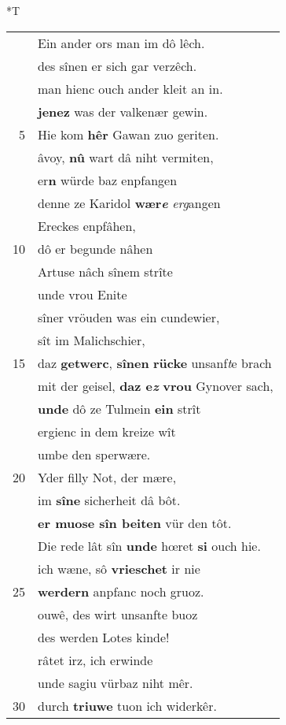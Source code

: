 \documentclass[8pt,a4paper,notitlepage]{article}
\begin{document}
\begin{table}[ht]
\begin{minipage}[t]{0.5\linewidth}
\small
\begin{center}*T
\end{center}
\begin{tabular}{rl}
 & Ein ander ors man im dô lêch.\\ 
 & des sînen er sich gar verzêch.\\ 
 & man hienc ouch ander kleit an in.\\ 
 & \textbf{jenez} was der valkenær gewin.\\ 
5 & Hie kom \textbf{hêr} Gawan zuo geriten.\\ 
 & âvoy, \textbf{nû} wart dâ niht vermiten,\\ 
 & er\textbf{n} würde baz enpfangen\\ 
 & denne ze Karidol \textbf{wær\textit{e}} \textit{erg}angen\\ 
 & Ereckes enpfâhen,\\ 
10 & dô er begunde nâhen\\ 
 & Artuse nâch sînem strîte\\ 
 & unde vrou Enite\\ 
 & sîner vröuden was ein cundewier,\\ 
 & sît im Malichschier,\\ 
15 & daz \textbf{getwerc}, \textbf{sînen} \textbf{rücke} unsanf\textit{t}e brach\\ 
 & mit der geisel, \textbf{daz e\textit{z}} \textbf{vrou} Gynover sach,\\ 
 & \textbf{unde} dô ze Tulmein \textbf{ein} strît\\ 
 & ergienc in dem kreize wît\\ 
 & umbe den sperwære.\\ 
20 & Yder filly Not, der mære,\\ 
 & im \textbf{sîne} sicherheit dâ bôt.\\ 
 & \textbf{er muose sîn beiten} vür den tôt.\\ 
 & Die rede lât sîn \textbf{unde} hœret \textbf{si} ouch hie.\\ 
 & ich wæne, sô \textbf{vrieschet} ir nie\\ 
25 & \textbf{werdern} anpfanc noch gruoz.\\ 
 & ouwê, des wirt unsanfte buoz\\ 
 & des werden Lotes kinde!\\ 
 & râtet irz, ich erwinde\\ 
 & unde sagiu vürbaz niht mêr.\\ 
30 & durch \textbf{triuwe} tuon ich widerkêr.\\ 

\end{tabular}
\end{minipage}
\end{table}
\end{document}
